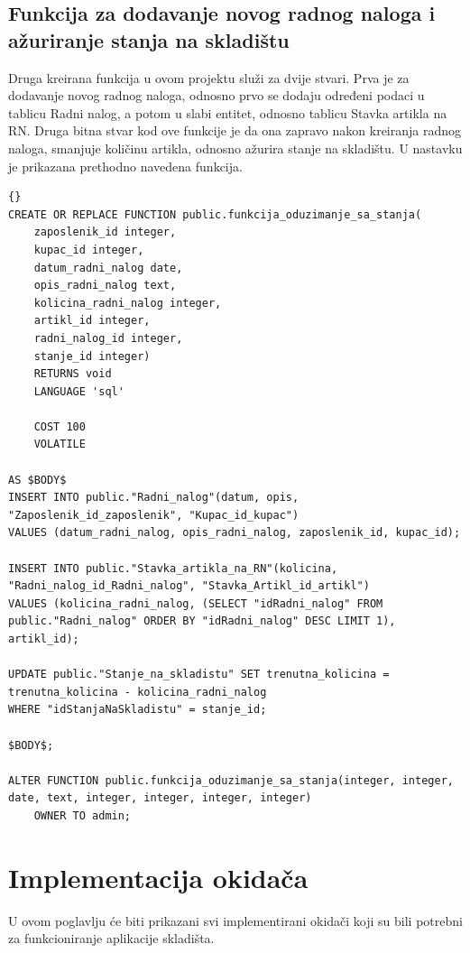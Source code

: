 \documentclass{foi}
\begin{document}
\subsection{Funkcija za dodavanje novog radnog naloga i ažuriranje stanja na skladištu}
Druga kreirana funkcija u ovom projektu služi za dvije stvari. Prva je za dodavanje novog radnog naloga, odnosno prvo se dodaju određeni podaci u tablicu Radni nalog, a potom u slabi entitet, odnosno tablicu Stavka artikla na RN. Druga bitna stvar kod ove funkcije je da ona zapravo nakon kreiranja radnog naloga, smanjuje količinu artikla, odnosno ažurira stanje na skladištu. U nastavku je prikazana prethodno navedena funkcija.
\lstset{commentstyle=\textit,language=python}
\begin{lstlisting}[frame=tb]{}
CREATE OR REPLACE FUNCTION public.funkcija_oduzimanje_sa_stanja(
	zaposlenik_id integer,
	kupac_id integer,
	datum_radni_nalog date,
	opis_radni_nalog text,
	kolicina_radni_nalog integer,
	artikl_id integer,
	radni_nalog_id integer,
	stanje_id integer)
    RETURNS void
    LANGUAGE 'sql'

    COST 100
    VOLATILE 
    
AS $BODY$
INSERT INTO public."Radni_nalog"(datum, opis, "Zaposlenik_id_zaposlenik", "Kupac_id_kupac") 
VALUES (datum_radni_nalog, opis_radni_nalog, zaposlenik_id, kupac_id);

INSERT INTO public."Stavka_artikla_na_RN"(kolicina, "Radni_nalog_id_Radni_nalog", "Stavka_Artikl_id_artikl") 
VALUES (kolicina_radni_nalog, (SELECT "idRadni_nalog" FROM public."Radni_nalog" ORDER BY "idRadni_nalog" DESC LIMIT 1), artikl_id);

UPDATE public."Stanje_na_skladistu" SET trenutna_kolicina = trenutna_kolicina - kolicina_radni_nalog
WHERE "idStanjaNaSkladistu" = stanje_id;

$BODY$;

ALTER FUNCTION public.funkcija_oduzimanje_sa_stanja(integer, integer, date, text, integer, integer, integer, integer)
    OWNER TO admin;
\end{lstlisting}
\newpage
\section{Implementacija okidača}
U ovom poglavlju će biti prikazani svi implementirani okidači koji su bili potrebni za funkcioniranje aplikacije skladišta.
\end{document}
